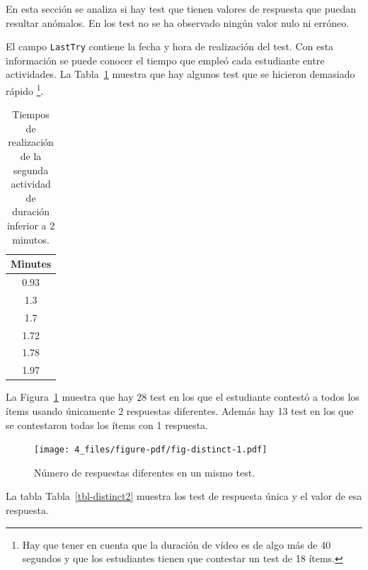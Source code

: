 \documentclass[
  12pt,
  a4paper,
  extrafontsizes,
  onecolumn,
  openright,
  table]{memoir}
\begin{document}
En esta sección se analiza si hay test que tienen valores de respuesta
que puedan resultar anómalos. En los test no se ha observado ningún
valor nulo ni erróneo.

El campo \texttt{LastTry} contiene la fecha y hora de realización del
test. Con esta información se puede conocer el tiempo que empleó cada
estudiante entre actividades. La Tabla~\ref{tbl-washout} muestra que hay
algunos test que se hicieron demasiado rápido \footnote{Hay que tener en
  cuenta que la duración de vídeo es de algo más de 40 segundos y que
  los estudiantes tienen que contestar un test de 18 ítems.}.

\hypertarget{tbl-washout}{}
\begin{longtable}{c}
\caption{\label{tbl-washout}Tiempos de realización de la segunda actividad de duración inferior a 2
minutos. }\tabularnewline

\toprule
Minutes \\ 
\midrule
0.93 \\ 
1.3 \\ 
1.7 \\ 
1.72 \\ 
1.78 \\ 
1.97 \\ 
\bottomrule
\end{longtable}

La Figura~\ref{fig-distinct} muestra que hay 28 test en los que el
estudiante contestó a todos los ítems usando únicamente 2 respuestas
diferentes. Además hay 13 test en los que se contestaron todas los ítems
con 1 respuesta.

\begin{figure}[h]

{\centering \texttt{[image: 4\_files/figure-pdf/fig-distinct-1.pdf]}

}

\caption{\label{fig-distinct}Número de respuestas diferentes en un mismo
test.}

\end{figure}

La tabla Tabla~\ref{tbl-distinct2} muestra los test de respuesta única y
el valor de esa respuesta.
\end{document}
